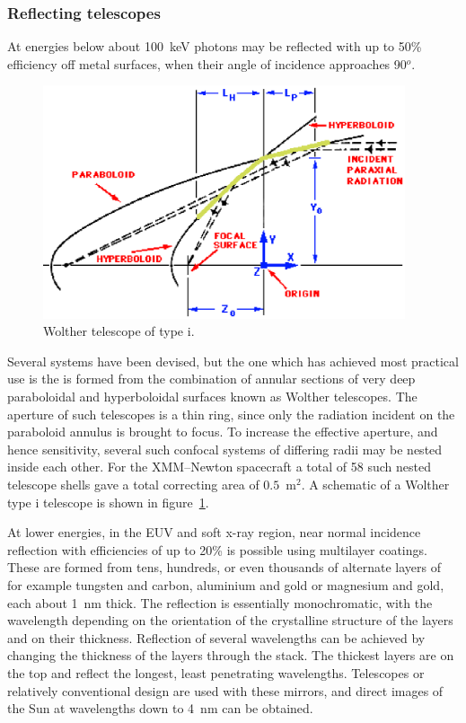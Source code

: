 \subsubsection{Reflecting telescopes}
At energies below about 100~keV photons
may be reflected with up to 50\% efficiency off metal surfaces, when
their angle of incidence approaches 90$^o$.

\begin{figure}[h]
  \centering
	\includegraphics[width=0.95\textwidth]{paraboloid_hyperboloid.eps}
  \caption{Wolther telescope of type {\sc i}.}
  \label{fig:wolther_i}
\end{figure}

Several systems have been devised, but the one which has achieved most practical
use is the is formed from the combination of annular sections of very deep paraboloidal
and hyperboloidal surfaces known as Wolther telescopes. The aperture of such
telescopes is a thin ring, since only the radiation incident on the paraboloid annulus is 
brought to focus. To increase the effective aperture, and hence sensitivity, several
such confocal systems of differing radii may be nested inside each other. For the 
XMM--Newton spacecraft a total of 58 such nested telescope shells gave a total
correcting area of $0.5$~m$^2$. A schematic of a Wolther type {\sc i} telescope is shown
in figure~\ref{fig:wolther_i}.

At lower energies, in the EUV and soft x-ray region, near normal incidence
reflection with efficiencies of up to 20\% is possible using multilayer coatings.
These are formed from tens,  hundreds, or even thousands of alternate layers of 
for example tungsten and carbon, aluminium and gold or magnesium and gold,
each about 1~nm thick. The reflection is essentially monochromatic, with the 
wavelength depending on the orientation of the crystalline structure of the layers and
on their thickness. Reflection of several wavelengths can be achieved by changing 
the thickness of the layers through the stack. The thickest layers are on the top and
reflect the longest, least penetrating wavelengths. Telescopes or relatively 
conventional design are used with these mirrors, and direct images of the Sun 
at wavelengths down to 4~nm can be obtained.

